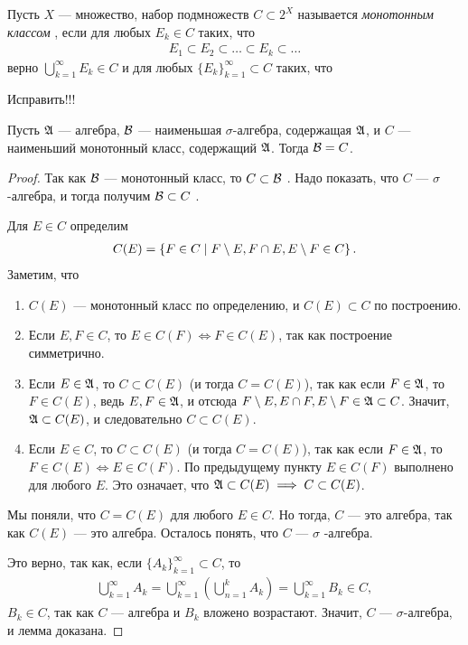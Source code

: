 \begin{df}
 Пусть $X$  --- множество, набор подмножеств $C \subset 2^{X}$ называется \textit{ монотонным классом }, если для любых $E_k \in C$  таких, что \begin{align*}
  E_1 \subset E_2 \subset \ldots \subset E_k \subset \ldots
 \end{align*} верно $\bigcup_{k=1}^{\infty} E_k \in C$ и для любых $\{E_{k}\}_{k=1}^{\infty} \subset C $  таких, что 


 Исправить!!!
\end{df}
\begin{lm}
\label{lemma:about_monotonous_class}
 
Пусть $\mathfrak{A}$ --- алгебра, $\mathcal{B}$ --- наименьшая $\sigma$-алгебра, содержащая $\mathfrak{A}$, и $C$ --- наименьший монотонный класс, содержащий $\mathfrak{A}$. Тогда $\mathcal{B} = C$.
\end{lm}
\begin{proof}
 Так как $\mathcal{B}$  --- монотонный класс, то $C \subset \mathcal{B}$ . Надо показать, что $C$  --- $\sigma$ -алгебра, и тогда получим $\mathcal{B} \subset C$ .

 Для $E \in C$ определим 
\begin{align*}
C(E) = \left\{ F \in C \;\middle|\; F \setminus E, F \cap E, E \setminus F \in C \right\}
.\end{align*} Заметим, что 
 \begin{enumerate}
  \item $C(E)$ --- монотонный класс по определению, и $C(E) \subset C$ по построению.
  \item Если $E, F \in C$, то $E \in C(F) \iff F \in C(E)$, так как построение симметрично.
  \item Если $E \in \mathfrak{A}$, то $C \subset C(E)$ (и тогда $C = C(E)$), так как если $F \in \mathfrak{A}$, то $F \in C(E)$, ведь $E,F \in \mathfrak{A}$, и отсюда $F \setminus E, E \cap F, E \setminus F \in \mathfrak{A} \subset C$. Значит, $\mathfrak{A} \subset C(E)$, и следовательно $C \subset C(E)$.
  \item Если $E \in C$, то $C \subset C(E)$ (и тогда $C = C(E)$), так как если $F \in \mathfrak{A}$, то $F \in C(E) \iff E \in C(F)$. По предыдущему пункту $E \in C(F)$ выполнено для любого $E$. Это означает, что $\mathfrak{A} \subset C(E) \implies C \subset C(E)$.
 \end{enumerate}

 Мы поняли, что $C = C(E)$ для любого  $E \in C$. Но тогда, $C$  --- это алгебра, так как $C(E)$ --- это алгебра. Осталось понять, что $C$ ---  $\sigma$ -алгебра.

 Это верно, так как, если $\{A_{k}\}_{k=1}^{\infty} \subset C $, то \begin{align*}
  \bigcup_{k=1}^{\infty} A_k = \bigcup_{k=1}^{\infty} \left( \bigcup_{n=1}^{k} A_k \right) = \bigcup_{k=1}^{\infty} B_k \in C
 ,\end{align*} $B_k \in C$, так как $C$ --- алгебра и $B_k$ вложено возрастают. Значит, $C$ --- $\sigma$-алгебра, и лемма доказана.
\end{proof}

